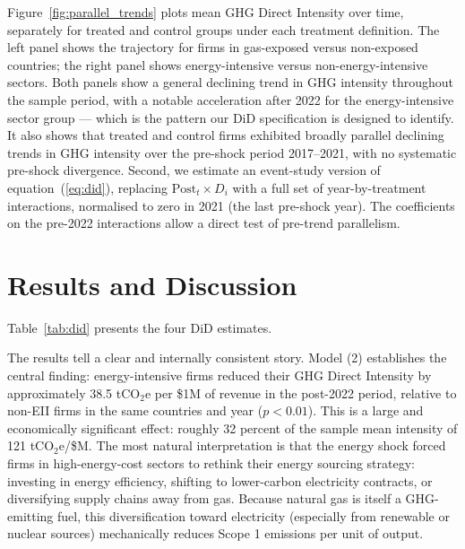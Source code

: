 \documentclass[12pt,a4paper]{article}
\begin{document}
Figure~\ref{fig:parallel_trends} plots mean GHG Direct Intensity over time, separately for treated and control groups under each treatment definition. The left panel shows the trajectory for firms in gas-exposed versus non-exposed countries; the right panel shows energy-intensive versus non-energy-intensive sectors. Both panels show a general declining trend in GHG intensity throughout the sample period, with a notable acceleration after 2022 for the energy-intensive sector group --- which is the pattern our DiD specification is designed to identify. It also shows that treated and control firms exhibited broadly parallel declining trends in GHG intensity over the pre-shock period 2017–2021, with no systematic pre-shock divergence. Second, we estimate an event-study version of equation~(\ref{eq:did}), replacing $\text{Post}_t \times D_i$ with a full set of year-by-treatment interactions, normalised to zero in 2021 (the last pre-shock year). The coefficients on the pre-2022 interactions allow a direct test of pre-trend parallelism.

\section{Results and Discussion}
\label{sec:results}

Table~\ref{tab:did} presents the four DiD estimates.

\begin{table}[H]
    \centering
    \small
    \caption{Difference-in-Differences: Effect on GHG Direct Intensity}
    \label{tab:did}
    
\end{table}

The results tell a clear and internally consistent story. Model (2) establishes the central finding: energy-intensive firms reduced their GHG Direct Intensity by approximately 38.5 tCO$_2$e per \$1M of revenue in the post-2022 period, relative to non-EII firms in the same countries and year ($p < 0.01$). This is a large and economically significant effect: roughly 32 percent of the sample mean intensity of 121 tCO$_2$e/\$M. The most natural interpretation is that the energy shock forced firms in high-energy-cost sectors to rethink their energy sourcing strategy: investing in energy efficiency, shifting to lower-carbon electricity contracts, or diversifying supply chains away from gas. Because natural gas is itself a GHG-emitting fuel, this diversification toward electricity (especially from renewable or nuclear sources) mechanically reduces Scope 1 emissions per unit of output.
\end{document}
